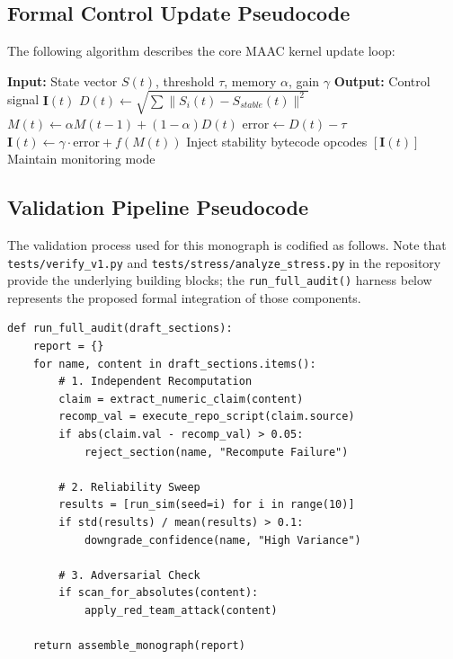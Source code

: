 \documentclass{article}
\begin{document}
\subsection{Formal Control Update Pseudocode}
The following algorithm describes the core MAAC kernel update loop:
\begin{algorithm}[h]
\caption{FluxVM MAAC Stability Update}
\begin{algorithmic}
\STATE \textbf{Input:} State vector $S(t)$, threshold $\tau$, memory $\alpha$, gain $\gamma$
\STATE \textbf{Output:} Control signal $\mathbf{I}(t)$
    \STATE $D(t) \leftarrow \sqrt{\sum \|S_i(t) - S_{stable}(t)\|^2}$
    \STATE $M(t) \leftarrow \alpha M(t-1) + (1-\alpha) D(t)$
        \STATE $\text{error} \leftarrow D(t) - \tau$
        \STATE $\mathbf{I}(t) \leftarrow \gamma \cdot \text{error} + f(M(t))$
        \STATE Inject stability bytecode opcodes $[\mathbf{I}(t)]$
    \ELSE
        \STATE Maintain monitoring mode
    \ENDIF
\ENDWHILE
\end{algorithmic}
\end{algorithm}

\subsection{Validation Pipeline Pseudocode}
The validation process used for this monograph is codified as follows. Note that
\texttt{tests/verify\_v1.py} and \texttt{tests/stress/analyze\_stress.py} in the
repository provide the underlying building blocks; the \texttt{run\_full\_audit()}
harness below represents the proposed formal integration of those components.
\begin{verbatim}
def run_full_audit(draft_sections):
    report = {}
    for name, content in draft_sections.items():
        # 1. Independent Recomputation
        claim = extract_numeric_claim(content)
        recomp_val = execute_repo_script(claim.source)
        if abs(claim.val - recomp_val) > 0.05:
            reject_section(name, "Recompute Failure")
            
        # 2. Reliability Sweep
        results = [run_sim(seed=i) for i in range(10)]
        if std(results) / mean(results) > 0.1:
            downgrade_confidence(name, "High Variance")
            
        # 3. Adversarial Check
        if scan_for_absolutes(content):
            apply_red_team_attack(content)
            
    return assemble_monograph(report)
\end{verbatim}
\end{document}
